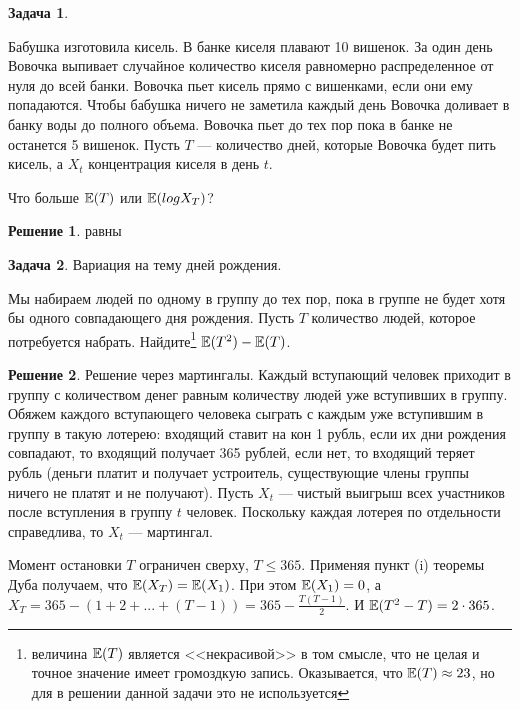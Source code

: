\documentclass[pdftex,12pt,a4paper]{article}
\numberwithin{equation}{page} %
\theoremstyle{definition} %
\theoremstyle{definition}
\theoremstyle{definition}
\newtheorem*{solution}{Решение}
\theoremstyle{definition}
\newtheorem{problem}{Задача}
\begin{document}
\begin{problem}\cite{wilmott:chap} %

Бабушка изготовила кисель. В банке киселя плавают 10 вишенок. За один день Вовочка выпивает случайное количество киселя равномерно распределенное от нуля до всей банки. Вовочка пьет кисель прямо с вишенками, если они ему попадаются. Чтобы бабушка ничего не заметила каждый день Вовочка доливает в банку воды до полного объема.
Вовочка пьет до тех пор пока в банке не останется 5 вишенок. Пусть $T$ --- количество дней, которые Вовочка будет пить кисель, а $X_{t}$ концентрация киселя в день $t$.

Что больше $\mathbb{E}(T)$ или $\mathbb{E}(log X_{T})$?
\end{problem}

\begin{solution}
равны
\end{solution}




\begin{problem} Вариация на тему дней рождения.

Мы набираем людей по одному в группу до тех пор, пока в группе не будет хотя бы одного совпадающего дня рождения. Пусть $T$ количество людей, которое потребуется набрать. Найдите\footnote{величина $\mathbb{E}(T)$ является <<некрасивой>> в том смысле, что не целая и точное значение имеет громоздкую запись. Оказывается, что $\mathbb{E}(T)\approx 23$, но для в решении данной задачи это не используется} $\mathbb{E}(T^{2})-\mathbb{E}(T)$. 
\end{problem}

\begin{solution}
Решение через мартингалы. Каждый вступающий человек приходит в группу с количеством денег равным количеству людей уже вступивших в группу. Обяжем каждого вступающего человека сыграть с каждым уже вступившим в группу в такую лотерею: входящий ставит на кон 1 рубль, если их дни рождения совпадают, то входящий получает 365 рублей, если нет, то входящий теряет рубль (деньги платит и получает устроитель, существующие члены группы ничего не платят и не получают). Пусть $X_{t}$ --- чистый выигрыш всех участников после вступления в группу $t$ человек. Поскольку каждая лотерея по отдельности справедлива, то $X_{t}$ --- мартингал. 

Момент остановки $T$ ограничен сверху, $T\leq 365$. Применяя пункт (i) теоремы Дуба получаем, что $\mathbb{E}(X_{T})=\mathbb{E}(X_{1})$. При этом $\mathbb{E}(X_{1})=0$, а $X_{T}=365-(1+2+...+(T-1))=365-\frac{T(T-1)}{2}$. И $\mathbb{E}(T^{2}-T)=2\cdot 365$.
\end{solution}
\end{document}
